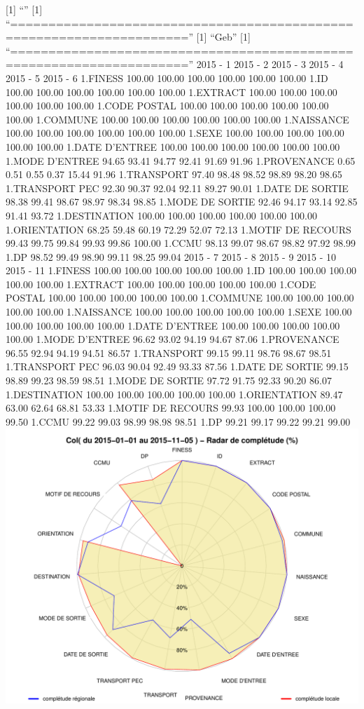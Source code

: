 \documentclass[]{article}
\begin{document}
{[}1{]} ``'' {[}1{]}
``=====================================================================''
{[}1{]} ``Geb'' {[}1{]}
``=====================================================================''
2015 - 1 2015 - 2 2015 - 3 2015 - 4 2015 - 5 2015 - 6 1.FINESS 100.00
100.00 100.00 100.00 100.00 100.00 1.ID 100.00 100.00 100.00 100.00
100.00 100.00 1.EXTRACT 100.00 100.00 100.00 100.00 100.00 100.00 1.CODE
POSTAL 100.00 100.00 100.00 100.00 100.00 100.00 1.COMMUNE 100.00 100.00
100.00 100.00 100.00 100.00 1.NAISSANCE 100.00 100.00 100.00 100.00
100.00 100.00 1.SEXE 100.00 100.00 100.00 100.00 100.00 100.00 1.DATE
D'ENTREE 100.00 100.00 100.00 100.00 100.00 100.00 1.MODE D'ENTREE 94.65
93.41 94.77 92.41 91.69 91.96 1.PROVENANCE 0.65 0.51 0.55 0.37 15.44
91.96 1.TRANSPORT 97.40 98.48 98.52 98.89 98.20 98.65 1.TRANSPORT PEC
92.30 90.37 92.04 92.11 89.27 90.01 1.DATE DE SORTIE 98.38 99.41 98.67
98.97 98.34 98.85 1.MODE DE SORTIE 92.46 94.17 93.14 92.85 91.41 93.72
1.DESTINATION 100.00 100.00 100.00 100.00 100.00 100.00 1.ORIENTATION
68.25 59.48 60.19 72.29 52.07 72.13 1.MOTIF DE RECOURS 99.43 99.75 99.84
99.93 99.86 100.00 1.CCMU 98.13 99.07 98.67 98.82 97.92 98.99 1.DP 98.52
99.49 98.90 99.11 98.25 99.04 2015 - 7 2015 - 8 2015 - 9 2015 - 10 2015
- 11 1.FINESS 100.00 100.00 100.00 100.00 100.00 1.ID 100.00 100.00
100.00 100.00 100.00 1.EXTRACT 100.00 100.00 100.00 100.00 100.00 1.CODE
POSTAL 100.00 100.00 100.00 100.00 100.00 1.COMMUNE 100.00 100.00 100.00
100.00 100.00 1.NAISSANCE 100.00 100.00 100.00 100.00 100.00 1.SEXE
100.00 100.00 100.00 100.00 100.00 1.DATE D'ENTREE 100.00 100.00 100.00
100.00 100.00 1.MODE D'ENTREE 96.62 93.02 94.19 94.67 87.06 1.PROVENANCE
96.55 92.94 94.19 94.51 86.57 1.TRANSPORT 99.15 99.11 98.76 98.67 98.51
1.TRANSPORT PEC 96.03 90.04 92.49 93.33 87.56 1.DATE DE SORTIE 99.15
98.89 99.23 98.59 98.51 1.MODE DE SORTIE 97.72 91.75 92.33 90.20 86.07
1.DESTINATION 100.00 100.00 100.00 100.00 100.00 1.ORIENTATION 89.47
63.00 62.64 68.81 53.33 1.MOTIF DE RECOURS 99.93 100.00 100.00 100.00
99.50 1.CCMU 99.22 99.03 98.99 98.98 98.51 1.DP 99.21 99.17 99.22 99.21
99.00 \includegraphics{completude_files/figure-latex/finess-12.pdf}
\end{document}
